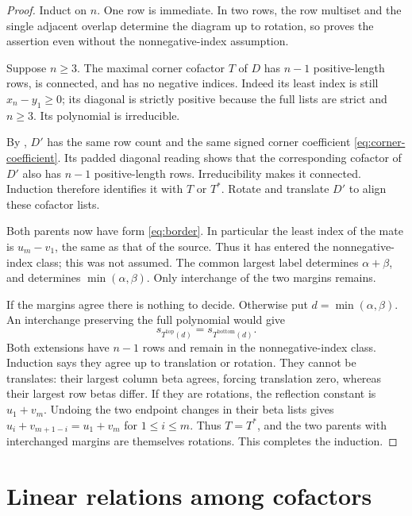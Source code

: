 \documentclass[11pt,a4paper]{amsart}
\numberwithin{equation}{section}
\theoremstyle{plain}
\theoremstyle{definition}
\begin{document}
\begin{proof}
Induct on \(n\).  One row is immediate.  In two rows, the row multiset and
the single adjacent overlap determine the diagram up to rotation, so
 proves the assertion even without the
nonnegative-index assumption.

Suppose \(n\ge3\).  The maximal corner cofactor \(T\) of \(D\) has
\(n-1\) positive-length rows, is connected, and has no negative indices.
Indeed its least index is still \(x_n-y_1\ge0\); its diagonal is strictly
positive because the full lists are strict and \(n\ge3\).
Its polynomial is irreducible.

By , \(D'\) has the same row count and the same
signed corner coefficient \eqref{eq:corner-coefficient}.  Its padded diagonal reading
shows that the corresponding cofactor of \(D'\) also has \(n-1\)
positive-length rows.  Irreducibility makes it connected.  Induction therefore
identifies it with \(T\) or \(T^*\).  Rotate and translate \(D'\) to align
these cofactor lists.

Both parents now have form \eqref{eq:border}.  In particular the least index
of the mate is \(u_m-v_1\), the same as that of the source.  Thus it has
entered the nonnegative-index class; this was not assumed.
The common largest label determines \(\alpha+\beta\), and
 determines \(\min(\alpha,\beta)\).  Only interchange
of the two margins remains.

If the margins agree there is nothing to decide.  Otherwise put
\(d=\min(\alpha,\beta)\).  An interchange preserving the full polynomial
would give
\[
 s_{T^{\mathrm{top}}(d)}=s_{T^{\mathrm{bottom}}(d)}.
\]
Both extensions have \(n-1\) rows and remain in the nonnegative-index class.
Induction says they agree up to translation or rotation.  They cannot be
translates: their largest column beta agrees, forcing translation zero,
whereas their largest row betas differ.  If they are rotations, the reflection
constant is \(u_1+v_m\).  Undoing the two endpoint changes in their beta lists
gives
\(u_i+v_{m+1-i}=u_1+v_m\) for \(1\le i\le m\).
Thus \(T=T^*\), and the two parents with interchanged margins are themselves
rotations.  This completes the induction.
\end{proof}

\section{Linear relations among cofactors}\label{sec:cofactors}
\end{document}
